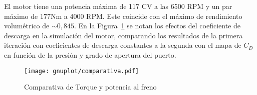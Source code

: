 

El motor tiene una potencia máxima de 117 CV a las 6500 RPM y un par máximo de
177Nm a 4000 RPM.
%
Este coincide con el máximo de rendimiento volumétrico de $\sim 0,845$.
%
En la Figura~\ref{fig:PoTi_segunda_op} se notan los efectos del coeficiente de
descarga en la simulación del motor, comparando los resultados de la primera
iteración con coeficientes de descarga constantes a la segunda con el mapa de
$C_{D}$ en función de la presión y grado de apertura del puerto.

\begin{figure}[ht]
  \centering
  \texttt{[image: gnuplot/comparativa.pdf]}
  \caption{Comparativa de Torque y potencia al freno} \label{fig:PoTi_segunda_op}
\end{figure}

